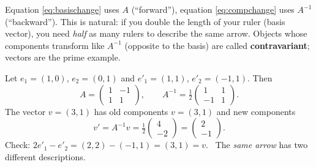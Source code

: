 \begin{intuition}
Equation \eqref{eq:basischange} uses $A$ (``forward''), equation \eqref{eq:compchange} uses $A^{-1}$ (``backward''). This is natural: if you double the length of your ruler (basis vector), you need \emph{half} as many rulers to describe the same arrow. Objects whose components transform like $A^{-1}$ (opposite to the basis) are called \textbf{contravariant}; vectors are the prime example.
\end{intuition}

\begin{example}
Let $e_1=(1,0)$, $e_2=(0,1)$ and $e'_1=(1,1)$, $e'_2=(-1,1)$. Then
\[
A=\begin{pmatrix}1&-1\\1&1\end{pmatrix},\qquad A^{-1}=\tfrac12\begin{pmatrix}1&1\\-1&1\end{pmatrix}.
\]
The vector $v=(3,1)$ has old components $v=(3,1)$ and new components
\[
v'=A^{-1}v=\tfrac12\begin{pmatrix}4\\-2\end{pmatrix}=\begin{pmatrix}2\\-1\end{pmatrix}.
\]
Check: $2e'_1-e'_2=(2,2)-(-1,1)=(3,1)=v$. \checkmark\ The \emph{same arrow} has two different descriptions.
\end{example}
